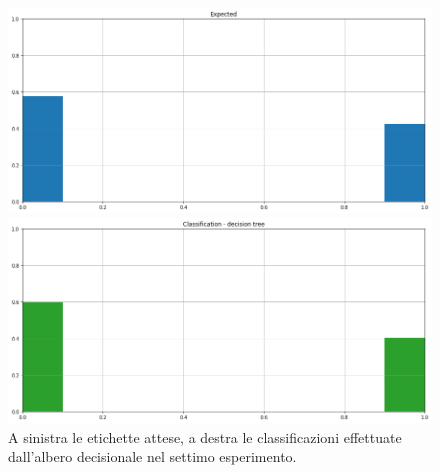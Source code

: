 \documentclass[12pt]{report}
\theoremstyle{definition}
\begin{document}
\begin{figure}
\centering
    \begin{minipage}{0.48\textwidth}
        \includegraphics[width=\linewidth]{images/experiment kaggle/expected_classification.png}
    \end{minipage}
    \begin{minipage}{0.48\textwidth}
        \includegraphics[width=\linewidth]{images/experiment kaggle/prediction_classification_dectree.png}
    \end{minipage}
    \caption{A sinistra le etichette attese, a destra le classificazioni effettuate dall'albero decisionale nel settimo esperimento.}
    \label{dt_exp7}
\end{figure} 
\end{document}

